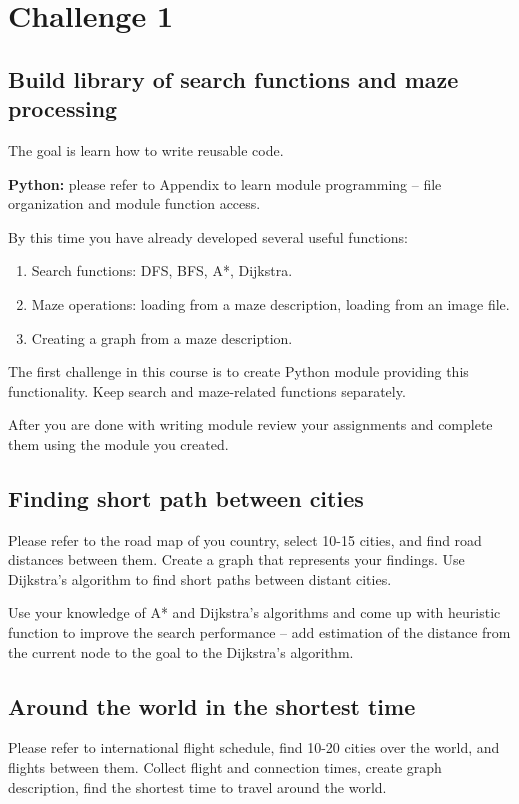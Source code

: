 \section{Challenge 1} 
\subsection{Build library of search functions and maze processing}
The goal is learn how to write reusable code.

\begin{tcolorbox}
\textbf{Python:} please refer to Appendix to learn
module programming -- file organization and module function access.
\end{tcolorbox}

By this time you have already developed several useful functions:
\begin{enumerate}
\item Search functions: DFS, BFS, A*, Dijkstra.
\item Maze operations: loading from a maze description, loading from an image file.
\item Creating a graph from a maze description.
\end{enumerate}

The first challenge in this course is to create Python module providing
this functionality. Keep search and maze-related functions separately.

After you are done with writing module review your assignments 
and complete them using the module you created.

\subsection{Finding short path between cities}

Please refer to the road map of you country, select 10-15 cities, and
find road distances between them. Create a graph that represents your
findings. Use Dijkstra's algorithm to find short paths between distant
cities.

Use your knowledge of A* and Dijkstra's algorithms and come up with
heuristic function to improve the search performance -- add estimation
of the distance from the current node to the goal 
to the Dijkstra's algorithm.

\subsection{Around the world in the shortest time}

Please refer to international flight schedule, find 10-20 cities
over the world, and flights between them. Collect flight and connection
times, create graph description, find the shortest time to travel
around the world. 












